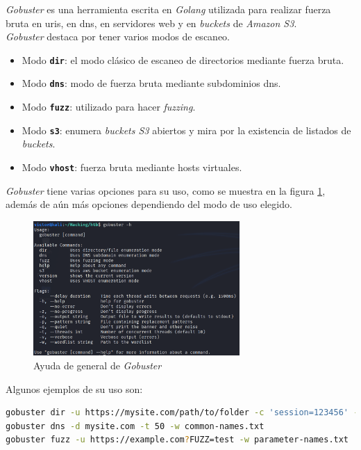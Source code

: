 \textit{Gobuster}\cite{gobuster} es una herramienta escrita en \textit{Golang} utilizada para realizar fuerza bruta en \acrshort{uri}s, en \acrshort{dns}, en servidores web y en \textit{buckets} de \textit{Amazon S3}.\\

\textit{Gobuster} destaca por tener varios modos de escaneo.

\begin{itemize}
    \item Modo \texttt{\textbf{dir}}: el modo clásico de escaneo de directorios mediante fuerza bruta.
    \item Modo \texttt{\textbf{dns}}: modo de fuerza bruta mediante subdominios \acrshort{dns}.
    \item Modo \texttt{\textbf{fuzz}}: utilizado para hacer \textit{fuzzing}.
    \item Modo \texttt{\textbf{s3}}: enumera \textit{buckets S3} abiertos y mira por la existencia de listados de \textit{buckets}.
    \item Modo \texttt{\textbf{vhost}}: fuerza bruta mediante hosts virtuales.
\end{itemize}

\textit{Gobuster} tiene varias opciones para su uso, como se muestra en la figura \ref{fig:gobuster-help}, además de aún más opciones dependiendo del modo de uso elegido.

\begin{figure}[h]
    \centering
    \includegraphics[width=0.7\textwidth]{images/sections/tools/gobuster.png}
    \caption{Ayuda de general de \textit{Gobuster}}
    \label{fig:gobuster-help}
\end{figure}

Algunos ejemplos de su uso son:

\begin{lstlisting}[language=bash]
gobuster dir -u https://mysite.com/path/to/folder -c 'session=123456' -t 50 -w common-files.txt -x .php,.html
gobuster dns -d mysite.com -t 50 -w common-names.txt
gobuster fuzz -u https://example.com?FUZZ=test -w parameter-names.txt
\end{lstlisting}